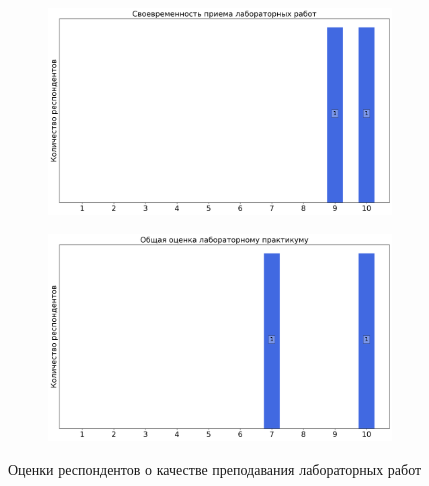 \begin{figure}[H]
\begin{subfigure}[b]{0.45\textwidth}
				\includegraphics[width=\textwidth]{images/2 course/Радиотехнические цепи и сигналы/labniks-marks-Демин Д.А.-2.png}
			\end{subfigure}
			\begin{subfigure}[b]{0.45\textwidth}
				\centering
				\includegraphics[width=\textwidth]{images/2 course/Радиотехнические цепи и сигналы/labniks-marks-Демин Д.А.-3.png}
			\end{subfigure}	
			\caption{Оценки респондентов о качестве преподавания лабораторных работ}
		\end{figure}


    
